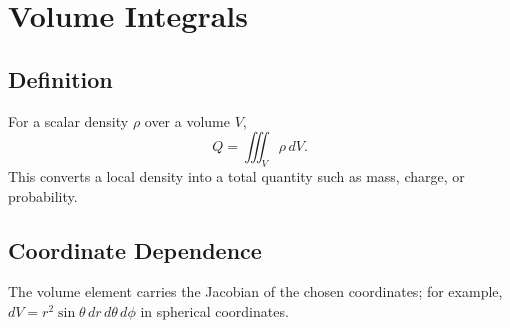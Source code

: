 \section{Volume Integrals}
\label{sec:volume-integrals}
\subsection{Definition}
For a scalar density $\rho$ over a volume $V$,
\[
Q=\iiint_V \rho\,dV.
\]
This converts a local density into a total quantity such as mass, charge, or probability.
\subsection{Coordinate Dependence}
The volume element carries the Jacobian of the chosen coordinates; for example, $dV=r^2\sin\theta\,dr\,d\theta\,d\phi$ in spherical coordinates.
